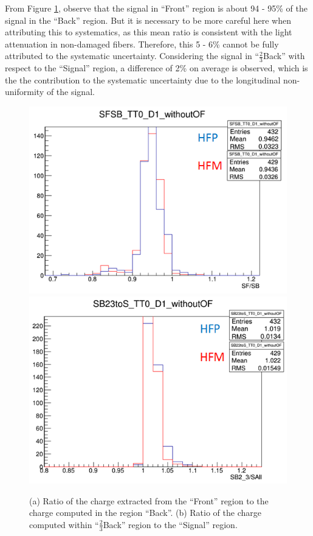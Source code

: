 From Figure \ref{fig:HF_LongUni}, observe that the signal in ``Front'' region is about 94 - 95\% of the signal in the ``Back'' region. But it is necessary to be more careful here when attributing this to systematics, as this mean ratio is consistent with the light attenuation in non-damaged fibers. Therefore, this 5 - 6\% cannot be fully attributed to the systematic uncertainty. Considering the signal in ``$\frac{2}{3}$Back'' with respect to the ``Signal'' region, a difference of 2\% on average is observed, which is the the contribution to the systematic uncertainty due to the longitudinal non-uniformity of the signal.
\begin{figure}[htb]
    \centering
    \includegraphics[width=.45\textwidth]{figures/ch_hfcalibration/SFSB_D1_woOF.png}
    \includegraphics[width=.45\textwidth]{figures/ch_hfcalibration/SB23toS_D1_woOF.png}
    \caption{(a) Ratio of the charge extracted from the ``Front'' region to the charge computed in the region ``Back''. (b) Ratio of the charge computed within ``$\frac{2}{3}$Back'' region to the ``Signal'' region.}
    \label{fig:HF_LongUni}
\end{figure}

